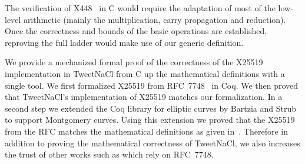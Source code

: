 The verification of \eg X448~\cite{cryptoeprint:2015:625,rfc7748} in C would
require the adaptation of most of the low-level arithmetic (mainly the
multiplication, carry propagation and reduction).
Once the correctness and bounds of the basic operations are established,
reproving the full ladder would make use of our generic definition.

We provide a mechanized formal proof of the correctness of the X25519
implementation in TweetNaCl from C up the mathematical definitions with a single tool.
We first formalized X25519 from RFC~7748~\cite{rfc7748} in Coq.
We then proved that TweetNaCl's implementation of X25519 matches our formalization.
In a second step we extended the Coq library for elliptic curves \cite{BartziaS14}
by Bartzia and Strub to support Montgomery curves.
Using this extension we proved that the X25519 from the RFC matches the
mathematical definitions as given in~\cite[Sec.~2]{Ber06}.
Therefore in addition to proving the mathematical correctness of TweetNaCl,
we also increases the trust of other works such as
\cite{zinzindohoue2017hacl,Erbsen2016SystematicSO} which rely on RFC~7748.

